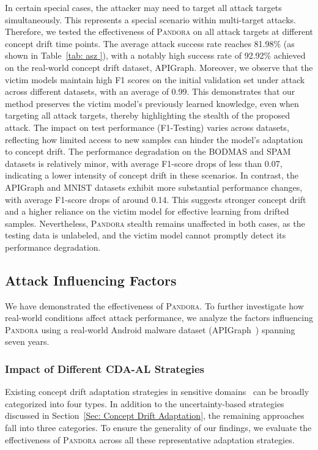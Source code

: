 \documentclass[lettersize,journal]{IEEEtran}
\newcommand{\pandora}{{\scshape Pandora}\xspace}
\begin{document}
In certain special cases, the attacker may need to target all attack targets simultaneously.
This represents a special scenario within multi-target attacks.
Therefore, we tested the effectiveness of \pandora on all attack targets at different concept drift time points.
The average attack success rate reaches 81.98\% (as shown in Table~\ref{tab: asz }), with a notably high success rate of 92.92\% achieved on the real-world concept drift dataset, APIGraph.  
Moreover, we observe that the victim models maintain high F1 scores on the initial validation set under attack across different datasets, with an average of 0.99.
This demonstrates that our method preserves the victim model’s previously learned knowledge, even when targeting all attack targets, thereby highlighting the stealth of the proposed attack.
The impact on test performance (F1-Testing) varies across datasets, reflecting how limited access to new samples can hinder the model’s adaptation to concept drift.
The performance degradation on the BODMAS and SPAM datasets is relatively minor, with average F1-score drops of less than 0.07, indicating a lower intensity of concept drift in these scenarios.
In contrast, the APIGraph and MNIST datasets exhibit more substantial performance changes, with average F1-score drops of around 0.14.
This suggests stronger concept drift and a higher reliance on the victim model for effective learning from drifted samples.
Nevertheless, \pandora stealth remains unaffected in both cases, as the testing data is unlabeled, and the victim model cannot promptly detect its performance degradation.

\subsection{Attack Influencing Factors}
\label{Sec: Attack Influencing Factors}

We have demonstrated the effectiveness of \pandora.
To further investigate how real-world conditions affect attack performance, we analyze the factors influencing \pandora using a real-world Android malware dataset (APIGraph~\cite{2020-CCS-APIGraph}) spanning seven years.

\subsubsection{Impact of Different CDA-AL Strategies}
Existing concept drift adaptation strategies in sensitive domains~\cite{2023-Usenix-chenyizhen,2022-SP-Trancending,2021-Usenix-CDAE} can be broadly categorized into four types. 
In addition to the uncertainty-based strategies discussed in Section~\ref{Sec: Concept Drift Adaptation}, the remaining approaches fall into three categories. 
To ensure the generality of our findings, we evaluate the effectiveness of \pandora across all these representative adaptation strategies.
\end{document}
